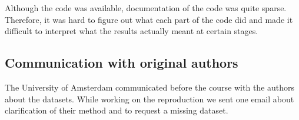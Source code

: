 Although the code was available, documentation of the code was quite sparse. Therefore, it was hard to figure out what each part of the code did and made it difficult to interpret what the results actually meant at certain stages. %

\subsection*{Communication with original authors}
The University of Amsterdam communicated before the course with the authors about the datasets. While working on the reproduction we sent one email about clarification of their method and to request a missing dataset.
\newpage

